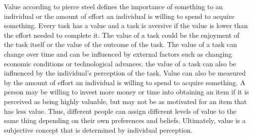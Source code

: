 Value  according to pierce steel  defines the importance of something to an individual or the amount of effort
 an individual is willing to spend to acquire something.
Every task has a value and a task is aversive if the value is lower than the effort needed to complete it.
The value of a task could be the enjoyment of the task itself or the value of the outcome of the task.
The value of a task can change over time and can be influenced by external factors such as changing economic conditions or technological advances.
the value of a task can also be influenced by the individual's perception of the task.
Value can also be measured by the amount of effort an individual is willing to spend to acquire something.
A person may be willing to invest more money or time into obtaining an item if it is perceived as being highly valuable,
but may not be as motivated for an item that has less value.
Thus, different people can assign different levels of value to the same thing depending on their own preferences and beliefs.
Ultimately, value is a subjective concept that is determined by individual perception.\cite{Steel2007}

